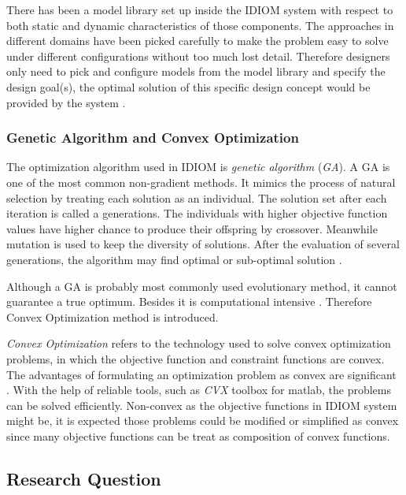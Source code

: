 There has been a model library set up inside the IDIOM system with respect to both static and dynamic characteristics of those components. The approaches in different domains have been picked carefully to make the problem easy to solve under different configurations without too much lost detail. Therefore designers only need to pick and configure models from the model library and specify the design goal(s), the optimal solution of this specific design concept would be provided by the system \cite{Holistic}. 

\subsubsection{Genetic Algorithm and Convex Optimization}
The optimization algorithm used in IDIOM is \textit{genetic algorithm} (\textit{GA}). A GA is one of the most common non-gradient methods. It mimics the process of natural selection by treating each solution as an individual. The solution set after each iteration  is called a generations. The individuals with higher objective function values have higher chance to produce their offspring by crossover. Meanwhile mutation is used to keep the diversity of solutions.  After the evaluation of several generations, the algorithm may find optimal or sub-optimal solution \cite{Nongradient}.

Although a GA is probably most commonly used evolutionary method, it cannot guarantee a true optimum. Besides it is computational intensive \cite{Roos}. Therefore Convex Optimization method is introduced.

\textit{Convex Optimization} refers to the technology used to solve convex optimization problems, in which the objective function and constraint functions are convex. The advantages of formulating an optimization problem as convex are significant \cite{Convex}. With the help of reliable tools, such as \textit{CVX} toolbox \cite{CVXtool} for matlab, the problems can be solved efficiently. Non-convex as the objective functions in IDIOM system might be, it is expected those problems could be modified or simplified as convex since many objective functions can be treat as composition of convex functions.

\subsection{Research Question}
